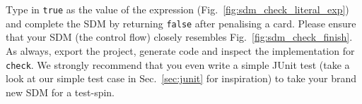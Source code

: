 Type in \texttt{true} as the value of the expression
(Fig.~\ref{fig:sdm_check_literal_exp}) and complete the SDM by returning
\texttt{false} after penalising a card.  Please ensure that your SDM (the
control flow) closely resembles Fig.~\ref{fig:sdm_check_finish}.  As always,
export the project, generate code and inspect the implementation for
\texttt{check}.  We strongly recommend that you even write a simple JUnit test
(take a look at our simple test case in Sec.~\ref{sec:junit} for inspiration)
to take your brand new SDM for a test-spin.
